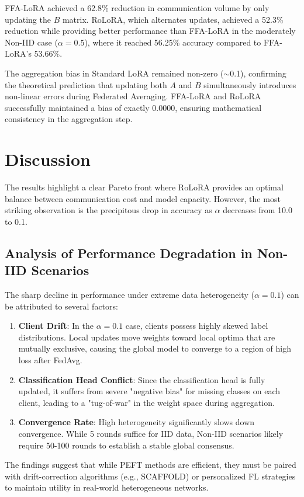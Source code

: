 \documentclass[twocolumn]{article}
\begin{document}
FFA-LoRA achieved a 62.8\% reduction in communication volume by only updating the $B$ matrix. RoLoRA, which alternates updates, achieved a 52.3\% reduction while providing better performance than FFA-LoRA in the moderately Non-IID case ($\alpha=0.5$), where it reached 56.25\% accuracy compared to FFA-LoRA's 53.66\%.

The aggregation bias in Standard LoRA remained non-zero ($\sim$0.1), confirming the theoretical prediction that updating both $A$ and $B$ simultaneously introduces non-linear errors during Federated Averaging. FFA-LoRA and RoLoRA successfully maintained a bias of exactly 0.0000, ensuring mathematical consistency in the aggregation step.

\section{Discussion}
The results highlight a clear Pareto front where RoLoRA provides an optimal balance between communication cost and model capacity. However, the most striking observation is the precipitous drop in accuracy as $\alpha$ decreases from 10.0 to 0.1.

\subsection{Analysis of Performance Degradation in Non-IID Scenarios}
The sharp decline in performance under extreme data heterogeneity ($\alpha=0.1$) can be attributed to several factors:
\begin{enumerate}
    \item \textbf{Client Drift}: In the $\alpha=0.1$ case, clients possess highly skewed label distributions. Local updates move weights toward local optima that are mutually exclusive, causing the global model to converge to a region of high loss after FedAvg.
    \item \textbf{Classification Head Conflict}: Since the classification head is fully updated, it suffers from severe "negative bias" for missing classes on each client, leading to a "tug-of-war" in the weight space during aggregation.
    \item \textbf{Convergence Rate}: High heterogeneity significantly slows down convergence. While 5 rounds suffice for IID data, Non-IID scenarios likely require 50-100 rounds to establish a stable global consensus.
\end{enumerate}

The findings suggest that while PEFT methods are efficient, they must be paired with drift-correction algorithms (e.g., SCAFFOLD) or personalized FL strategies to maintain utility in real-world heterogeneous networks.
\end{document}
